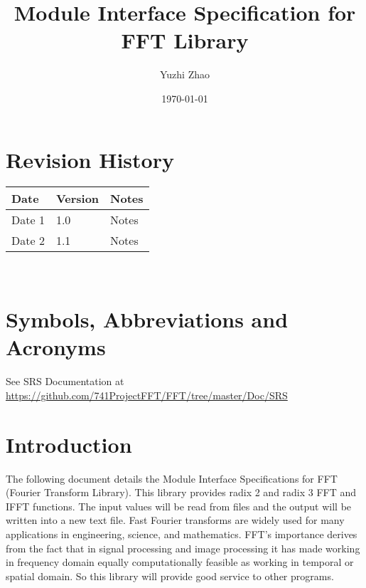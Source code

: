 \documentclass[12pt, titlepage]{article}
\begin{document}
\title{Module Interface Specification for FFT Library}

\author{Yuzhi Zhao}

\date{\today}

\maketitle


\section{Revision History}

\begin{tabularx}{\textwidth}{p{3cm}p{2cm}X}
\toprule {\bf Date} & {\bf Version} & {\bf Notes}\\
\midrule
Date 1 & 1.0 & Notes\\
Date 2 & 1.1 & Notes\\
\bottomrule
\end{tabularx}

~\newpage

\section{Symbols, Abbreviations and Acronyms}

See SRS Documentation at \url {https://github.com/741ProjectFFT/FFT/tree/master/Doc/SRS}


\newpage

\tableofcontents

\newpage


\section{Introduction}

The following document details the Module Interface Specifications for FFT (Fourier Transform Library). This library provides radix 2 and radix 3 FFT and IFFT functions. The input values will be read from files and the output will be written into a new text file. Fast Fourier transforms are widely used for many applications in engineering, science, and mathematics. FFT's importance derives from the fact that in signal processing and image processing it has made working in frequency domain equally computationally feasible as working in temporal or spatial domain. So this library will provide good service to other programs.\\
\end{document}
